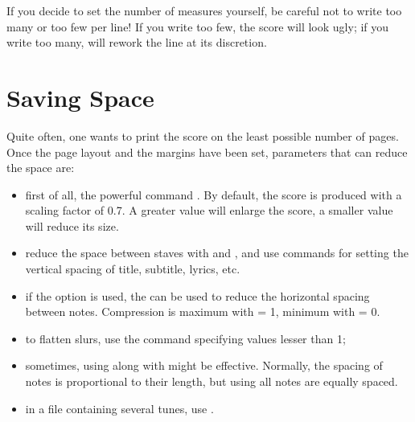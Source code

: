 \documentclass[a4paper,fullpage,12pt]{book}
\begin{document}
\begin{warn}

  If you decide to set the number of measures yourself, be careful not
  to write too many or too few per line! If you write too few, the
  score will look ugly; if you write too many, \abcm{} will rework the
  line at its discretion.

\end{warn}




\section{Saving Space}
\label{sec:saving}

Quite often, one wants to print the score on the least possible number
of pages. Once the page layout and the margins have been set,
parameters that can reduce the space are:

\begin{itemize}
  
  \item first of all, the powerful command 
  . By default, the score is produced with a scaling
  factor of 0.7. A greater value will enlarge the score, a smaller
  value will reduce its size.
  
  \item reduce the space between staves with  and
  , and use commands for setting the vertical
  spacing of title, subtitle, lyrics, etc.\ 
  
  \item if the  option is used, the 
   can be used to reduce the horizontal spacing between
  notes. Compression is maximum with  = 1, minimum with
   = 0.
  
  \item to flatten slurs, use the  command
  specifying values lesser than 1;
  
  \item sometimes, using  along
  with  might be effective. Normally, the spacing
  of notes is proportional to their length, but using
   all notes are equally spaced.
  
  \item in a file containing several tunes, use .
  
\end{itemize}
\end{document}
